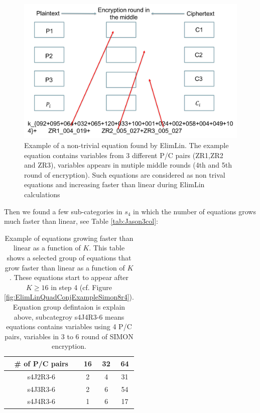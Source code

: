 \begin{figure}[h!]
	\vspace{-0.2cm}
	\centering
	\includegraphics*[width=160mm]{./pics/ElimLinDeep.png}
	\caption[Example of a non-trivial equation found by ElimLin]{Example of a non-trivial equation found by ElimLin. The example equation contains variables from 3 different P/C pairs (ZR1,ZR2 and ZR3), variables appears in mutiple middle rounds (4th and 5th round of encryption). Such equations are considered as non trival equations and increasing faster than linear during ElimLin calculations}
	\label{fig:DeepLin1}
	\vspace{-0.1cm}
\end{figure}

Then we found a few sub-categories in $s_4$ in which the number of equations grows much faster than linear, see Table \ref{tab:Jason3col}:

\begin{table}[h!]
	\caption[Example of equations growing faster than linear as a function of $K$]{Example of equations growing faster than linear as a function of $K$. This table shows a selected group of equations that grow faster than linear as a function of $K$. These equations start to appear after $K \geq 16$ in step 4 (cf. Figure \ref{fig:ElimLinQuadConjExampleSimon8r4}). Equation group defintaion is explain above, subcategroy s4J4R3-6 means equations contains variables using 4 P/C pairs, variables in 3 to 6 round of SIMON encryption.  }\label{tab:Jason3col} \centering
	\label{Tab:SplitS4in3main}
\begin{tabular}{|c|c|c|c|}
	\hline
	\# of P/C pairs& 16 & 32 & 64 \\ \hline
	s4J2R3-6 & 2  & 4  & 31 \\ \hline
	s4J3R3-6 & 2  & 6  & 54 \\ \hline
	s4J4R3-6 & 1  & 6  & 17 \\ \hline
\end{tabular}
\end{table}


